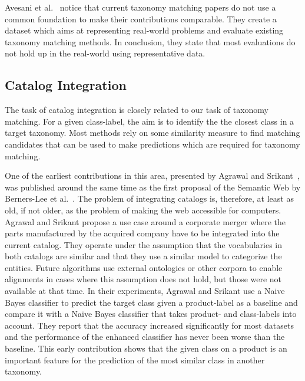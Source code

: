 Avesani et al.\@~\cite{avesani2005large} notice that current taxonomy matching papers do not use a common foundation
to make their contributions comparable.
They create a dataset which aims at representing real-world problems and evaluate existing taxonomy matching methods.
In conclusion, they state that most evaluations do not hold up in the real-world using representative data.

\subsection{Catalog Integration}

The task of catalog integration is closely related to our task of taxonomy matching.
For a given class-label, the aim is to identify the the closest class in a target taxonomy.
Most methods rely on some similarity measure to find matching candidates that can
be used to make predictions which are required for taxonomy matching.

One of the earliest contributions in this area, presented by Agrawal and Srikant~\cite{agrawal2001integrating},
was published around the same time as the first proposal of the Semantic Web by Berners-Lee et al.\@~\cite{berners2001semantic}.
The problem of integrating catalogs is, therefore, at least as old, if not older, as the problem of making the web accessible
for computers.
Agrawal and Srikant propose a use case around a corporate merger where the parts manufactured by the acquired company
have to be integrated into the current catalog.
They operate under the assumption that the vocabularies in both catalogs are similar and that they use a similar model
to categorize the entities.
Future algorithms use external ontologies or other corpora to enable alignments in cases where this assumption does not
hold, but those were not available at that time.
In their experiments, Agrawal and Srikant use a Naive Bayes classifier to predict the target class given a product-label
as a baseline and compare it with a Naive Bayes classifier that takes product- and class-labels into account.
They report that the accuracy increased significantly for most datasets and the performance of the enhanced classifier
has never been worse than the baseline.
This early contribution shows that the given class on a  product is an important feature for the prediction of the most
similar class in another taxonomy.

